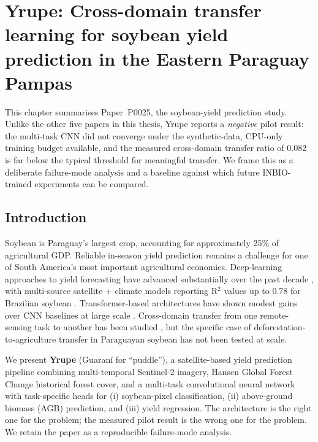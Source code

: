 
\chapter{Yrupe: Cross-domain transfer learning for soybean yield
prediction in the Eastern Paraguay Pampas}\n\label{ch:yrupe}

This chapter summarises Paper~P0025, the soybean-yield prediction study.
Unlike the other five papers in this thesis, Yrupe reports a
\emph{negative} pilot result: the multi-task CNN did not converge under
the synthetic-data, CPU-only training budget available, and the
measured cross-domain transfer ratio of 0.082 is far below the typical
threshold for meaningful transfer. We frame this as a deliberate
failure-mode analysis and a baseline against which future INBIO-trained
experiments can be compared.

\section{Introduction}
\label{sec:yrupe-intro}

Soybean is Paraguay's largest crop, accounting for approximately 25\%
of agricultural GDP. Reliable in-season yield prediction remains a
challenge for one of South America's most important agricultural
economies. Deep-learning approaches to yield forecasting have advanced
substantially over the past decade \citep{prenafeta2018,yang2021}, with
multi-source satellite + climate models reporting R$^2$ values up to
0.78 for Brazilian soybean \citep{peng2023}. Transformer-based
architectures have shown modest gains over CNN baselines at large scale
\citep{huang2022}. Cross-domain transfer from one remote-sensing task
to another has been studied \citep{russwurm2020,kattenborn2021,tseng2022},
but the specific case of deforestation-to-agriculture transfer in
Paraguayan soybean has not been tested at scale.

We present \textbf{Yrupe} (Guaran\'i for ``puddle''), a satellite-based
yield prediction pipeline combining multi-temporal Sentinel-2 imagery,
Hansen Global Forest Change historical forest cover, and a multi-task
convolutional neural network with task-specific heads for (i)
soybean-pixel classification, (ii) above-ground biomass (AGB) prediction,
and (iii) yield regression. The architecture is the right one for the
problem; the measured pilot result is the wrong one for the problem.
We retain the paper as a reproducible failure-mode analysis.

